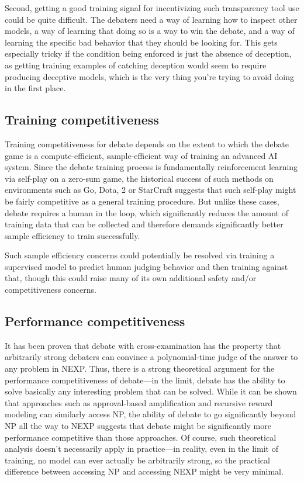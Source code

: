 \documentclass[
  onecolumn,
  natbib,
]{miri-tech-article}
\begin{document}
Second, getting a good training signal for incentivizing such transparency tool use could be quite difficult. The debaters need a way of learning how to inspect other models, a way of learning that doing so is a way to win the debate, and a way of learning the specific bad behavior that they should be looking for. This gets especially tricky if the condition being enforced is just the absence of deception, as getting training examples of catching deception would seem to require producing deceptive models, which is the very thing you're trying to avoid doing in the first place.

\subsection{Training competitiveness} Training competitiveness for debate depends on the extent to which the debate game is a compute-efficient, sample-efficient way of training an advanced AI system. Since the debate training process is fundamentally reinforcement learning via self-play on a zero-sum game, the historical success of such methods on environments such as Go,\cite{go} Dota, 2\cite{openai_five} or StarCraft\cite{alphastar} suggests that such self-play might be fairly competitive as a general training procedure. But unlike these cases, debate requires a human in the loop, which significantly reduces the amount of training data that can be collected and therefore demands significantly better sample efficiency to train successfully.

Such sample efficiency concerns could potentially be resolved via training a supervised model to predict human judging behavior and then training against that, though this could raise many of its own additional safety and/or competitiveness concerns.

\subsection{Performance competitiveness} It has been proven that debate with cross-examination has the property that arbitrarily strong debaters can convince a polynomial-time judge of the answer to any problem in NEXP.\cite{debate_progress} Thus, there is a strong theoretical argument for the performance competitiveness of debate---in the limit, debate has the ability to solve basically any interesting problem that can be solved. While it can be shown that approaches such as approval-based amplification and recursive reward modeling can similarly access NP, the ability of debate to go significantly beyond NP all the way to NEXP suggests that debate might be significantly more performance competitive than those approaches. Of course, such theoretical analysis doesn't necessarily apply in practice---in reality, even in the limit of training, no model can ever actually be arbitrarily strong, so the practical difference between accessing NP and accessing NEXP might be very minimal.
\end{document}
